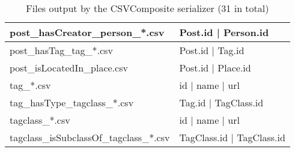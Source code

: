 \begin{table}[htb]
\begin{tabular}{|p{4.6cm}|p{11.4cm}|}
    	post\_hasCreator\_person\_*.csv          & Post.id | Person.id                                                                                         \\ \hline
    	post\_hasTag\_tag\_*.csv                 & Post.id | Tag.id                                                                                            \\ \hline
    	post\_isLocatedIn\_place.csv             & Post.id | Place.id                                                                                          \\ \hline
    	tag\_*.csv                               & id | name | url                                                                                             \\ \hline
    	tag\_hasType\_tagclass\_*.csv            & Tag.id | TagClass.id                                                                                        \\ \hline
    	tagclass\_*.csv                          & id | name | url                                                                                             \\ \hline
    	tagclass\_isSubclassOf\_tagclass\_*.csv  & TagClass.id | TagClass.id                                                                                   \\ \hline
    \end{tabular}
    \caption{Files output by the CSVComposite serializer (31 in total)}
    \label{table:csv}
\end{table}
